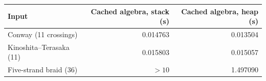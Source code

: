 \begin{tabular}{lrr}
\toprule
Input & Cached algebra, stack (s) & Cached algebra, heap (s) \\
\midrule
Conway (11 crossings) & 0.014763 & 0.013504 \\
Kinoshita--Terasaka (11) & 0.015803 & 0.015057 \\
Five-strand braid (36) & $>10$ & 1.497090 \\
\bottomrule
\end{tabular}
